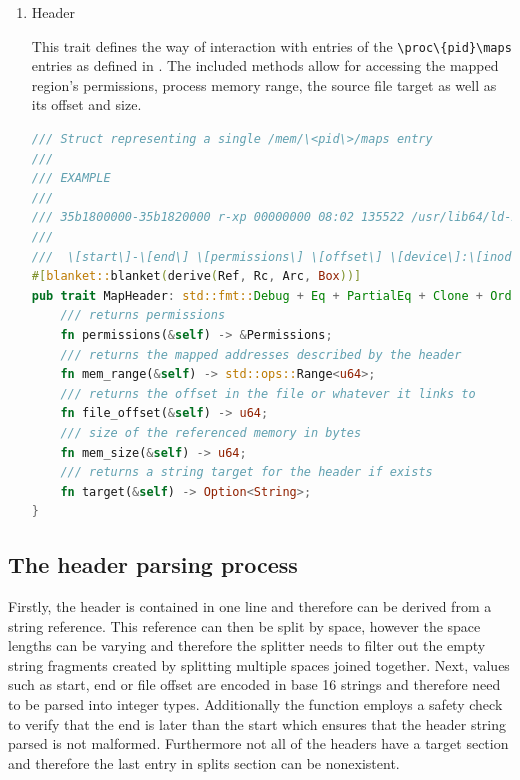 \begin{enumerate}
    \item \label{reader:header}Header
    
    This trait defines the way of interaction with entries of the \verb|\proc\{pid}\maps| entries as defined in \cite{kerrisk_proc_pid_maps5_2024}.
    The included methods allow for accessing the mapped region's permissions, process memory range, the source file target as well as its offset and size. 
\begin{lstlisting}[caption=\label{lst:header}"The Header Trait definition", language=Rust]
/// Struct representing a single /mem/\<pid\>/maps entry
///
/// EXAMPLE
///
/// 35b1800000-35b1820000 r-xp 00000000 08:02 135522 /usr/lib64/ld-2.15.so
///
///  \[start\]-\[end\] \[permissions\] \[offset\] \[device\]:\[inode\] \[links_to\]
#[blanket::blanket(derive(Ref, Rc, Arc, Box))]
pub trait MapHeader: std::fmt::Debug + Eq + PartialEq + Clone + Ord {
    /// returns permissions
    fn permissions(&self) -> &Permissions;
    /// returns the mapped addresses described by the header
    fn mem_range(&self) -> std::ops::Range<u64>;
    /// returns the offset in the file or whatever it links to
    fn file_offset(&self) -> u64;
    /// size of the referenced memory in bytes
    fn mem_size(&self) -> u64;
    /// returns a string target for the header if exists
    fn target(&self) -> Option<String>;
}    
\end{lstlisting}
 
\end{enumerate}


\subsection{The header parsing process}

Firstly, the header is contained in one line and therefore can be derived from a string reference. This reference can then be split by space, however the space lengths can be varying and therefore the splitter needs to filter out the empty string fragments created by splitting multiple spaces joined together.
Next, values such as start, end or file offset are encoded in base 16 strings and therefore need to be parsed into integer types. 
Additionally the function employs a safety check to verify that the end is later than the start which ensures that the header string parsed is not malformed. 
Furthermore not all of the headers have a target section and therefore the last entry in splits section can be nonexistent.

